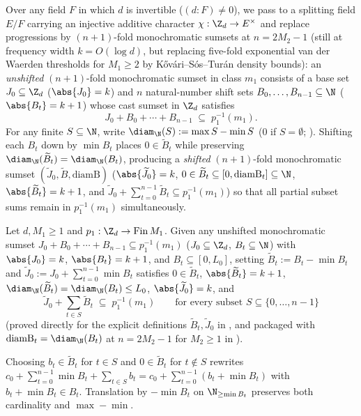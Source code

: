 Over any field $F$ in which $d$ is invertible ($(d : F) \ne 0$), we pass to a splitting field $E/F$
carrying an injective additive character $\chi : \Z_d \to E^\times$ and replace progressions by
$(n + 1)$-fold monochromatic sumsets at $n = 2M_2 - 1$ (still at frequency width $k = O(\log d)$, but
replacing five-fold exponential van der Waerden thresholds for $M_1 \ge 2$ by K\H{o}v\'ari--S\'os--Tur\'an
density bounds): an \emph{unshifted} $(n+1)$-fold monochromatic
sumset in class $m_1$ consists of a base set $J_0 \subseteq \Z_d$ ($\abs{J_0} = k$) and $n$
natural-number shift sets $B_0, \dots, B_{n-1} \subseteq \N$ ($\abs{B_t} = k + 1$) whose cast sumset in
$\Z_d$ satisfies
\[
  J_0 + B_0 + \cdots + B_{n - 1} \;\subseteq\; p_1^{-1}(m_1).
\]
For any finite $S \subseteq \N$, write $\diam_{\N}(S) := \max S - \min S$ ($0$ if $S = \emptyset$;
). Shifting each $B_t$ down by $\min B_t$ places $0 \in \widetilde{B}_t$ while
preserving $\diam_{\N}(\widetilde{B}_t) = \diam_{\N}(B_t)$, producing a \emph{shifted} $(n+1)$-fold
monochromatic sumset $(\widetilde{J}_0, \widetilde{B}, \mathrm{diamB})$ ($\abs{\widetilde{J}_0} = k$,
$0 \in \widetilde{B}_t \subseteq [0, \mathrm{diamB}_t] \subseteq \N$, $\abs{\widetilde{B}_t} = k + 1$,
and $\widetilde{J}_0 + \sum_{t=0}^{n-1} \widetilde{B}_t \subseteq p_1^{-1}(m_1)$) so that all partial
subset sums remain in $p_1^{-1}(m_1)$ simultaneously.

\begin{lemma}\label{lem:sumset-shift}
Let $d, M_1 \ge 1$ and $p_1 : \Z_d \to \mathrm{Fin}\,M_1$. Given any unshifted monochromatic sumset
$J_0 + B_0 + \cdots + B_{n-1} \subseteq p_1^{-1}(m_1)$ ($J_0 \subseteq \Z_d$, $B_t \subseteq \N$) with
$\abs{J_0} = k$, $\abs{B_t} = k + 1$, and $B_t \subseteq [0, L_0]$, setting
$\widetilde{B}_t := B_t - \min B_t$ and $\widetilde{J}_0 := J_0 + \sum_{t=0}^{n-1} \min B_t$ satisfies
$0 \in \widetilde{B}_t$, $\abs{\widetilde{B}_t} = k + 1$,
$\diam_{\N}(\widetilde{B}_t) = \diam_{\N}(B_t) \le L_0$, $\abs{\widetilde{J}_0} = k$, and
\[
  \widetilde{J}_0 + \sum_{t \in S} \widetilde{B}_t \;\subseteq\; p_1^{-1}(m_1)
  \qquad \text{for every subset } S \subseteq \{0,\dots,n-1\}
\]
(proved directly for the explicit definitions $\widetilde{B}_t, \widetilde{J}_0$ in
, and packaged with $\mathrm{diamB}_t = \diam_{\N}(B_t)$ at
$n = 2M_2 - 1$ for $M_2 \ge 1$ in ).
\end{lemma}
\begin{outline}
Choosing $b_t \in \widetilde{B}_t$ for $t \in S$ and $0 \in \widetilde{B}_t$ for $t \notin S$
rewrites $c_0 + \sum_{t=0}^{n-1} \min B_t + \sum_{t \in S} b_t = c_0 + \sum_{t=0}^{n-1} (b_t + \min B_t)$
with $b_t + \min B_t \in B_t$. Translation by $-\min B_t$ on $\N_{\ge \min B_t}$ preserves both
cardinality and $\max - \min$.
\end{outline}


